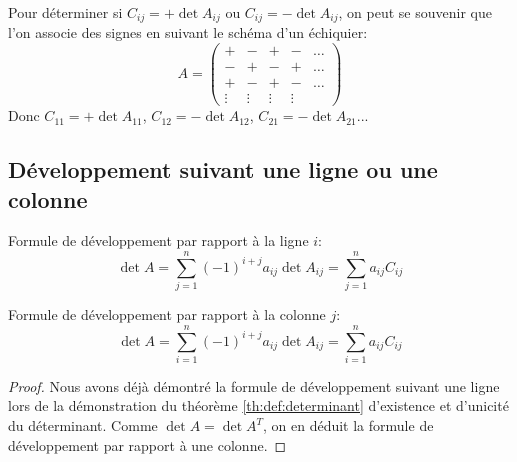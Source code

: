 \documentclass[class=report,crop=false]{standalone}
\begin{document}
Pour déterminer si $C_{ij} = +\det A_{ij} $ ou $C_{ij} = -\det A_{ij}$, on peut se souvenir
que l'on associe des signes en suivant le schéma d'un échiquier:
$$  A =
\begin{pmatrix}
+ & - & + & - &\dots\\
- & + & - & + &\dots \\
+ & - & + & - &\dots\\
\vdots & \vdots & \vdots & \vdots &
\end{pmatrix}
$$
Donc $C_{11} = +\det A_{11}$, $C_{12} = - \det A_{12}$,  $C_{21} = - \det A_{21}$...


\subsection{Développement suivant une ligne ou une colonne}
\label{sec:developpement-ligne-colonne}


\begin{theoreme}
Formule de développement par rapport à la ligne $i$:
$$\det A
= \sum_{j=1}^n (-1)^{i+j} a_{ij} \det A_{ij}
= \sum_{j=1}^n a_{ij} C_{ij}$$

Formule de développement par rapport à la colonne $j$:
$$\det A
= \sum_{i=1}^n (-1)^{i+j} a_{ij} \det A_{ij}
= \sum_{i=1}^n a_{ij}C_{ij}$$
\end{theoreme}

\begin{proof}
Nous avons déjà démontré la formule de  développement suivant une
ligne lors de la démonstration du théorème \ref{th:def:determinant}
d'existence et d'unicité du déterminant.
Comme $\det A=\det A^T$, on en déduit la formule de  développement par
rapport à une  colonne.
\end{proof}
\end{document}
